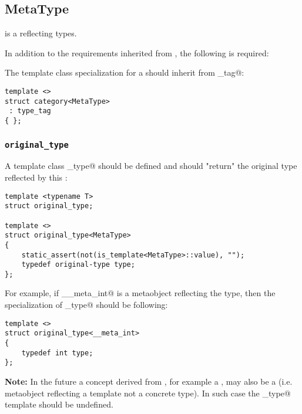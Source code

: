 \subsection{MetaType}
\label{concept-MetaType}

 is a  reflecting types.

In addition to the requirements inherited from , the following is required:

The \verb@category@ template class specialization for a  should
inherit from \verb@type_tag@:

\begin{verbatim}
template <>
struct category<MetaType>
 : type_tag
{ };
\end{verbatim}

\subsubsection{\texttt{original\_type}}

A template class \verb@original_type@ should be defined and should "return"
the original type reflected by this :

\begin{verbatim}
template <typename T>
struct original_type;

template <>
struct original_type<MetaType>
{
	static_assert(not(is_template<MetaType>::value), "");
	typedef original-type type;
};
\end{verbatim}

For example, if \verb@__meta_int@ is a metaobject reflecting the \verb@int@ type,
then the specialization of \verb@original_type@ should be following:

\begin{verbatim}
template <>
struct original_type<__meta_int>
{
	typedef int type;
};
\end{verbatim}

\textbf{Note:} In the future a concept derived from , for example a ,
may also be a  (i.e. metaobject reflecting a template not a concrete type).
In such case the \verb@original_type@ template should be undefined.

